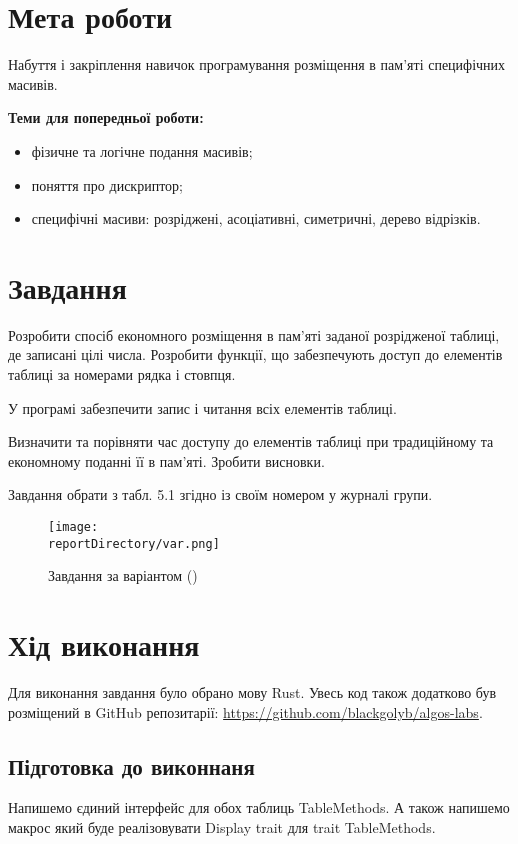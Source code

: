 \section{Мета роботи}
Набуття і закріплення навичок програмування розміщення в пам’яті специфічних масивів.

\noindent
\textbf{Теми для попередньої роботи:}
\begin{itemize}
    \item фізичне та логічне подання масивів;
    \item поняття про дискриптор;
    \item специфічні масиви: розріджені, асоціативні, симетричні, дерево відрізків.
\end{itemize}


\section{Завдання}
Розробити спосіб економного розміщення в пам’яті заданої 
розрідженої таблиці, де записані цілі числа. Розробити функції,
що забезпечують доступ до елементів таблиці за номерами рядка і стовпця.

У програмі забезпечити запис і читання всіх елементів таблиці.

Визначити та порівняти час доступу до елементів таблиці при традиційному та економному поданні її в пам’яті. Зробити висновки.

Завдання обрати з табл. 5.1 згідно із своїм номером у журналі групи.


\begin{figure}[h!]
    \centering
    \texttt{[image: \\reportDirectory/var.png]}
    \caption{Завдання за варіантом (\variant)}
    \label{fig:task}
\end{figure}


\section{Хід виконання}
Для виконання завдання було обрано мову Rust.
Увесь код також додатково був розміщений в GitHub репозитарії: \href{https://github.com/blackgolyb/algos-labs}{https://github.com/blackgolyb/algos-labs}.


\newpage
\subsection{Підготовка до виконнаня}
Напишемо єдиний інтерфейс для обох таблиць TableMethods.
А також напишемо макрос який буде реалізовувати Display trait для trait TableMethods.


